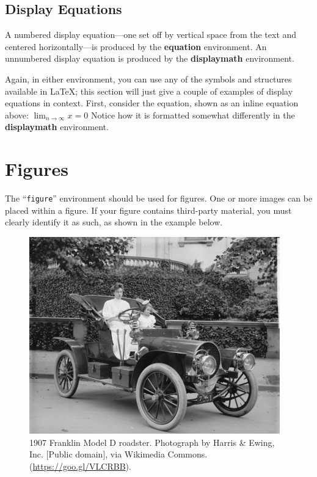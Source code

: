 \documentclass[
acmsmall,
nonacm,
screen,
acmthm]{../templates/acmart}
\makeatletter
\newcounter{figno}
\newenvironment{fignos:no-prefix-figure-caption}{
  \caption@ifcompatibility{}{
    \let\oldthefigure\thefigure
    \let\oldtheHfigure\theHfigure
    \renewcommand{\thefigure}{figno:\thefigno}
    \renewcommand{\theHfigure}{figno:\thefigno}
    \stepcounter{figno}
    \captionsetup{labelformat=empty}
  }
}{
  \caption@ifcompatibility{}{
    \captionsetup{labelformat=default}
    \let\thefigure\oldthefigure
    \let\theHfigure\oldtheHfigure
    \addtocounter{figure}{-1}
  }
}
\makeatother
\begin{document}
\hypertarget{display-equations}{%
\subsection{Display Equations}\label{display-equations}}

A numbered display equation---one set off by vertical space from the
text and centered horizontally---is produced by the \textbf{equation}
environment. An unnumbered display equation is produced by the
\textbf{displaymath} environment.

Again, in either environment, you can use any of the symbols and
structures available in LaTeX; this section will just give a couple of
examples of display equations in context. First, consider the equation,
shown as an inline equation above: \(\lim_{n\rightarrow \infty}x=0\)
Notice how it is formatted somewhat differently in the
\textbf{displaymath} environment.

\hypertarget{figures}{%
\section{Figures}\label{figures}}

The ``\texttt{figure}'' environment should be used for figures. One or
more images can be placed within a figure. If your figure contains
third-party material, you must clearly identify it as such, as shown in
the example below.

\begin{fignos:no-prefix-figure-caption}

\begin{figure}
\centering
\includegraphics{sample-franklin.png}
\caption{1907 Franklin Model D roadster. Photograph by Harris \& Ewing,
Inc. {[}Public domain{]}, via Wikimedia Commons.
(\url{https://goo.gl/VLCRBB}).}
\end{figure}

\end{fignos:no-prefix-figure-caption}
\end{document}
